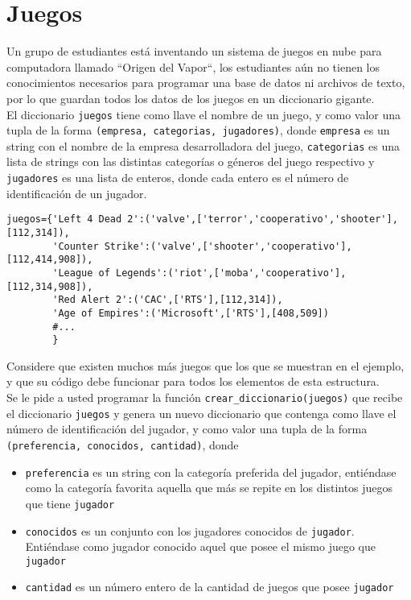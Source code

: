 \section{Juegos}

Un grupo de estudiantes está inventando un sistema de juegos en nube para computadora llamado ``Origen del Vapor``, los estudiantes aún no tienen los conocimientos necesarios para programar una base de datos ni archivos de texto, por lo que guardan todos los datos de los juegos en un diccionario gigante.
\\
El diccionario \texttt{juegos} tiene como llave el nombre de un juego, y como valor una tupla de la forma \texttt{(empresa, categorias, jugadores)}, donde \texttt{empresa} es un string con el nombre de la empresa desarrolladora del juego, \texttt{categorias} es una lista de strings con las distintas categorías o géneros del juego respectivo y \texttt{jugadores} es una lista de enteros, donde cada entero es el número de identificación de un jugador.

\begin{lstlisting}[style=consola]
juegos={'Left 4 Dead 2':('valve',['terror','cooperativo','shooter'],[112,314]),
        'Counter Strike':('valve',['shooter','cooperativo'],[112,414,908]),
        'League of Legends':('riot',['moba','cooperativo'],[112,314,908]),
        'Red Alert 2':('CAC',['RTS'],[112,314]),
        'Age of Empires':('Microsoft',['RTS'],[408,509])
        #...
        }
\end{lstlisting}

Considere que existen muchos más juegos que los que se muestran en el ejemplo, y que su código debe funcionar para todos los elementos de esta estructura.
\\
Se le pide a usted programar la función \texttt{crear\_diccionario(juegos)} que recibe el diccionario \texttt{juegos} y genera un nuevo diccionario que contenga como llave el número de identificación del jugador, y como valor una tupla de la forma \texttt{(preferencia, conocidos, cantidad)}, donde 
\begin{itemize}
    \item \texttt{preferencia} es un string con la categoría preferida del jugador, entiéndase como la categoría favorita aquella que más se repite en los distintos juegos que tiene \texttt{jugador}
    \item \texttt{conocidos} es un conjunto con los jugadores conocidos de \texttt{jugador}. Entiéndase como jugador conocido aquel que posee el mismo juego que \texttt{jugador}
    \item \texttt{cantidad} es un número entero de la cantidad de juegos que posee \texttt{jugador}
\end{itemize}

